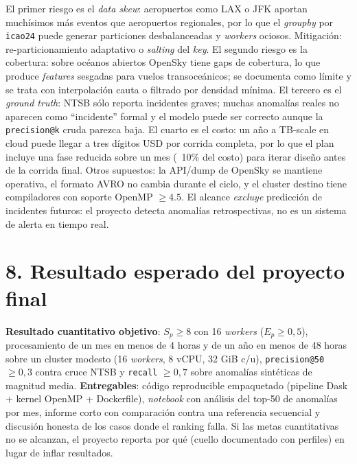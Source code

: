 \documentclass[letterpaper,11pt]{article}
\begin{document}
El primer riesgo es el \textit{data skew}: aeropuertos como LAX o JFK aportan muchísimos más eventos que aeropuertos regionales, por lo que el \textit{groupby} por \texttt{icao24} puede generar particiones desbalanceadas y \textit{workers} ociosos. Mitigación: re-particionamiento adaptativo o \textit{salting} del \textit{key}. El segundo riesgo es la cobertura: sobre océanos abiertos OpenSky tiene gaps de cobertura, lo que produce \textit{features} sesgadas para vuelos transoceánicos; se documenta como límite y se trata con interpolación cauta o filtrado por densidad mínima. El tercero es el \textit{ground truth}: NTSB sólo reporta incidentes graves; muchas anomalías reales no aparecen como ``incidente'' formal y el modelo puede ser correcto aunque la \texttt{precision@k} cruda parezca baja. El cuarto es el costo: un año a TB-scale en cloud puede llegar a tres dígitos USD por corrida completa, por lo que el plan incluye una fase reducida sobre un mes (~10\% del costo) para iterar diseño antes de la corrida final. Otros supuestos: la API/dump de OpenSky se mantiene operativa, el formato AVRO no cambia durante el ciclo, y el cluster destino tiene compiladores con soporte OpenMP $\geq 4.5$. El alcance \textit{excluye} predicción de incidentes futuros: el proyecto detecta anomalías retrospectivas, no es un sistema de alerta en tiempo real.

\section*{8. Resultado esperado del proyecto final}

\textbf{Resultado cuantitativo objetivo}: $S_p \geq 8$ con 16 \textit{workers} ($E_p \geq 0{,}5$), procesamiento de un mes en menos de 4 horas y de un año en menos de 48 horas sobre un cluster modesto (16 \textit{workers}, 8 vCPU, 32 GiB c/u), \texttt{precision@50} $\geq 0{,}3$ contra cruce NTSB y \texttt{recall} $\geq 0{,}7$ sobre anomalías sintéticas de magnitud media. \textbf{Entregables}: código reproducible empaquetado (pipeline Dask + kernel OpenMP + Dockerfile), \textit{notebook} con análisis del top-50 de anomalías por mes, informe corto con comparación contra una referencia secuencial y discusión honesta de los casos donde el ranking falla. Si las metas cuantitativas no se alcanzan, el proyecto reporta por qué (cuello documentado con perfiles) en lugar de inflar resultados.
\end{document}
